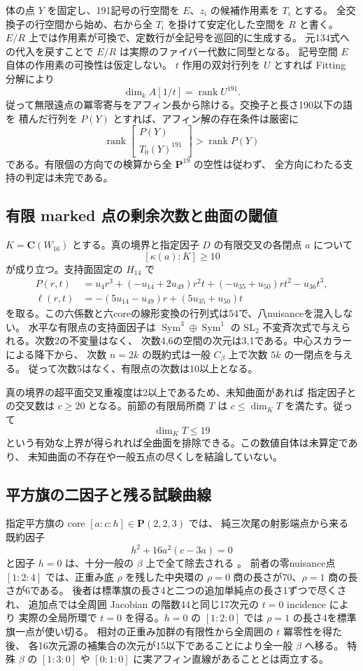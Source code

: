 \documentclass[11pt,a4paper]{ltjsarticle}
\newcommand{\CC}{\mathbf C}
\newcommand{\PP}{\mathbf P}
\DeclareMathOperator{\rank}{rank}
\theoremstyle{remark}
\begin{document}
体の点 $Y$ を固定し、191記号の行空間を $E$、$z_i$ の候補作用素を $T_i$ とする。
全交換子の行空間から始め、右から全 $T_i$ を掛けて安定化した空間を $R$ と書く。
$E/R$ 上では作用素が可換で、定数行が全記号を巡回的に生成する。
元134式への代入を戻すことで $E/R$ は実際のファイバー代数に同型となる。
記号空間 $E$ 自体の作用素の可換性は仮定しない。
$t$ 作用の双対行列を $U$ とすれば Fitting 分解により
\[
 \dim_k A[1/t]=\rank U^{191}.
\]
従って無限遠点の冪零寄与をアフィン長から除ける。交換子と長さ190以下の語を
積んだ行列を $P(Y)$ とすれば、アフィン解の存在条件は厳密に
\[
 \rank\begin{bmatrix}P(Y)\\T_0(Y)^{191}\end{bmatrix}>\rank P(Y)
\]
である。有限個の方向での検算から全 $\PP^{19}$ の空性は従わず、
全方向にわたる支持の判定は未完である。

\subsection{有限 marked 点の剰余次数と曲面の閾値}
$K=\CC(W_{16})$ とする。真の境界と指定因子 $D$ の有限交叉の各閉点 $a$ について
\[
 [\kappa(a):K]\ge10
\]
が成り立つ\cite{anchor-residue-v60}。支持面固定の $H_{14}$ で
\[
 \begin{split}
 P(r,t)&=u_4r^3+(-u_{14}+2u_{49})r^2t+(-u_{35}+u_{50})rt^2-u_{36}t^3,\\
 \ell(r,t)&=-(5u_{14}-u_{49})r+(5u_{35}+u_{50})t
 \end{split}
\]
を取る。この六係数と六coreの線形変換の行列式は54で、八nuisanceを混入しない。
水平な有限点の支持面因子は $\operatorname{Sym}^3\oplus\operatorname{Sym}^1$ の
$\mathrm{SL}_2$ 不変斉次式で与えられる。次数2の不変量はなく、
次数4,6の空間の次元は3,1である。中心スカラーによる降下から、
次数 $n=2k$ の既約式は一般 $C_\beta$ 上で次数 $5k$ の一閉点を与える。
従って次数5はなく、有限点の次数は10以上となる。

真の境界の超平面交叉重複度は2以上であるため、未知曲面があれば
指定因子との交叉数は $c\ge20$ となる。前節の有限局所商 $T$ は
$c\le\dim_K T$ を満たす。従って
\[
 \dim_K T\le19
\]
という有効な上界が得られれば全曲面を排除できる。この数値自体は未算定であり、
未知曲面の不存在や一般五点の尽くしを結論していない。

\subsection{平方旗の二因子と残る試験曲線}
指定平方旗の core $[a:c:h]\in\PP(2,2,3)$ では、
純三次尾の射影端点から来る既約因子
\[
 h^2+16a^2(c-3a)=0
\]
と因子 $h=0$ は、十分一般の $\beta$ 上で全て除去される
\cite{sigma-pure-v60,sigma-zero-h-v60,sigma-end-review-v60}。
前者の零nuisance点 $[1:2:4]$ では、正重み底 $\rho$ を残した中央環の
$\rho=0$ 商の長さが70、$\rho=1$ 商の長さが6である。
後者は標準旗の長さ4と二つの追加単純点の長さ1ずつで尽くされ、
追加点では全周囲 Jacobian の階数44と同じ17次元の $t=0$ incidence により
実際の全局所環で $t=0$ を得る。$h=0$ の $[1:2:0]$ では
$\rho=1$ の長さ4を標準旗一点が使い切る。
相対の正重み加群の有限性から全周囲の $t$ 冪零性を得た後、
各16次元源の補集合の次元が15以下であることにより全一般 $\beta$ へ移る。
特殊 $\beta$ の $[1:3:0]$ や $[0:1:0]$ に実アフィン直線があることとは両立する。
\end{document}
